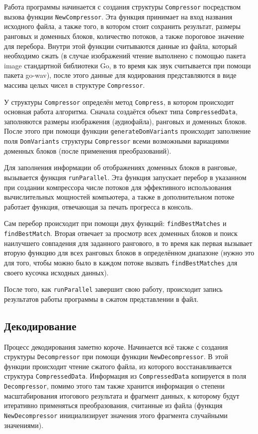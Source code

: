 \documentclass[bachelor,paper]{pmk-graduate}
\theoremstyle{definition}
\begin{document}
Работа программы начинается с создания структуры \texttt{Compressor} посредством вызова функции \texttt{NewCompressor}. Эта функция принимает на вход названия исходного файла, а также того, в котором стоит сохранить результат, размеры ранговых и доменных блоков, количество потоков, а также пороговое значение для перебора. Внутри этой функции считываются данные из файла, который необходимо сжать (в случае изображений чтение выполнено с помощью пакета image стандартной библиотеки Go, в то время как звук считывается при помощи пакета go-wav), после этого данные для кодирования представляются в виде массива целых чисел в структуре \texttt{Compressor}.

У структуры \texttt{Compressor} определён метод \texttt{Compress}, в котором происходит основная работа алгоритма. Сначала создаётся объект типа \texttt{Comp\-res\-sed\-Da\-ta}, заполняются размеры изображения (аудиофайла), ранговых и доменных блоков. После этого при помощи функции \texttt{generateDomVariants} происходит заполнение поля \texttt{DomVariants} структуры \texttt{Compressor} всеми возможными вариациями доменных блоков (после применения преобразований).

Для заполнения информации об отображениях доменных блоков в ранговые, вызывается функция \texttt{runParallel}. Эта функция запускает перебор в указанном при создании компрессора числе потоков для эффективного использования вычислительных мощностей компьютера, а также в дополнительном потоке работает функция, отвечающая за печать прогресса в консоль.

Сам перебор происходит при помощи двух функций: \texttt{findBestMatches} и \texttt{findBestMatch}. Вторая отвечает за просмотр всех доменных блоков и поиск наилучшего совпадения для заданного рангового, в то время как первая вызывает вторую функцию для всех ранговых блоков в определённом диапазоне (нужно это для того, чтобы можно было в каждом потоке вызвать \texttt{findBestMatches} для своего кусочка исходных данных).

После того, как \texttt{runParallel} завершит свою работу, происходит запись результатов работы программы в сжатом представлении в файл.

\subsection{Декодирование}

Процесс декодирования заметно короче. Начинается всё также с создания структуры \texttt{Decompressor} при помощи функции \texttt{NewDecompressor}. В этой функции происходит чтение сжатого файла, из которого восстанавливается структура \texttt{CompressedData}. Информация из \texttt{CompressedData} копируется в поля \texttt{Decompressor}, помимо этого там также хранится информация о степени масштабирования итогового результата и фрагмент данных, к которому будут итеративно применяться преобразования, считанные из файла (функция \texttt{NewDecompressor} инициализирует значения этого фрагмента случайными значениями).
\end{document}

